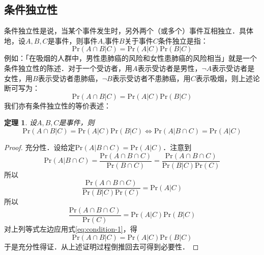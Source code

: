 \documentclass{ctexart}
\newcommand{\pr}{\mathrm{Pr}}
\newtheorem{theorem}{定理}
\begin{document}
    \subsection{条件独立性}
    条件独立性是说，当某个事件发生时，另外两个（或多个）事件互相独立．具体地，设$A,B,C$是事件，则事件$A$,事件$B$关于事件$C$条件独立是指：
    \begin{equation}
        \pr(A \cap B | C) = \pr(A | C) \pr(B | C)
    \end{equation}
    例如：「在吸烟的人群中，男性患肺癌的风险和女性患肺癌的风险相当」就是一个条件独立性的陈述．对于一个受访者，用$A$表示受访者是男性，$\neg A$表示受访者是女性，用$B$表示受访者患肺癌，$\neg B$表示受访者不患肺癌，用$C$表示吸烟，则上述论断可写为：
    \begin{equation}
        \pr(A \cap B | C) = \pr(A | C) \pr(B | C)
    \end{equation}
    我们亦有条件独立性的等价表述：
    \begin{theorem}
        设$A,B,C$是事件，则
        \begin{equation}
            \pr(A \cap B | C) = \pr(A | C) \pr(B | C) \iff \pr(A | B \cap C) = \pr(A | C)
        \end{equation}
    \end{theorem}
    \begin{proof}
        充分性．设给定$\pr(A|B\cap C)=\pr(A|C)$．注意到
        \begin{equation}
            \pr(A | B \cap C) = \frac{\pr(A \cap B \cap C)}{\pr(B \cap C)} = \frac{\pr(A\cap B \cap C)}{\pr(B|C) \pr(C)}
        \end{equation}
        所以
        \begin{equation}
            \frac{\pr(A\cap B \cap C)}{\pr(B|C)\pr(C)} = \pr(A|C)
        \end{equation}
        所以
        \begin{equation}
            \frac{\pr(A \cap B \cap C)}{\pr(C)} = \pr(A|C) \pr(B|C)
        \end{equation}
        对上列等式左边应用式\ref{eq:condition-1}，得
        \begin{equation}
            \pr(A \cap B | C) = \pr(A|C)\pr(B|C)
        \end{equation}
        于是充分性得证．从上述证明过程倒推回去可得到必要性．
    \end{proof}
\end{document}
